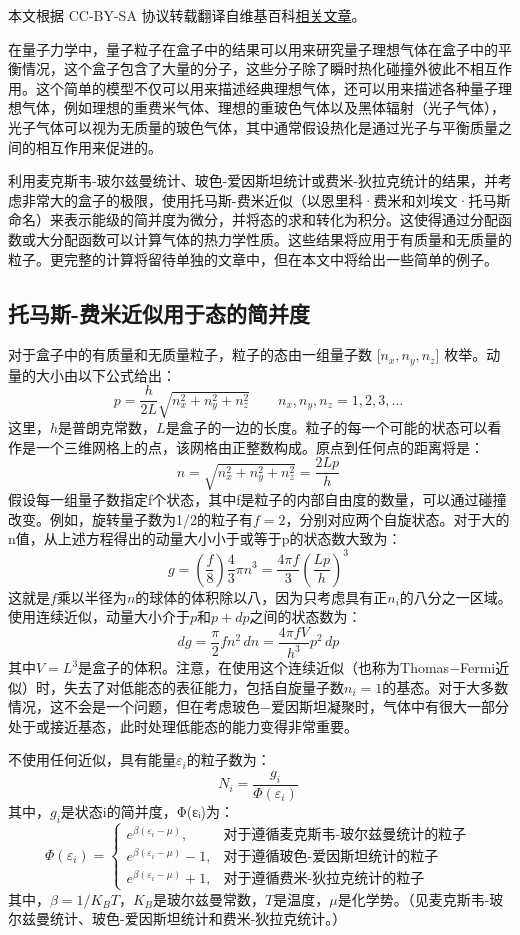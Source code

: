 
本文根据 CC-BY-SA 协议转载翻译自维基百科\href{https://en.wikipedia.org/wiki/Gas_in_a_box}{相关文章}。

在量子力学中，量子粒子在盒子中的结果可以用来研究量子理想气体在盒子中的平衡情况，这个盒子包含了大量的分子，这些分子除了瞬时热化碰撞外彼此不相互作用。这个简单的模型不仅可以用来描述经典理想气体，还可以用来描述各种量子理想气体，例如理想的重费米气体、理想的重玻色气体以及黑体辐射（光子气体），光子气体可以视为无质量的玻色气体，其中通常假设热化是通过光子与平衡质量之间的相互作用来促进的。

利用麦克斯韦-玻尔兹曼统计、玻色-爱因斯坦统计或费米-狄拉克统计的结果，并考虑非常大的盒子的极限，使用托马斯-费米近似（以恩里科·费米和刘埃文·托马斯命名）来表示能级的简并度为微分，并将态的求和转化为积分。这使得通过分配函数或大分配函数可以计算气体的热力学性质。这些结果将应用于有质量和无质量的粒子。更完整的计算将留待单独的文章中，但在本文中将给出一些简单的例子。
\subsection{托马斯-费米近似用于态的简并度}  
对于盒子中的有质量和无质量粒子，粒子的态由一组量子数 [\(n_x, n_y, n_z\)] 枚举。动量的大小由以下公式给出：
\[
p = \frac{h}{2L} \sqrt{n_x^2 + n_y^2 + n_z^2} \quad \quad n_x, n_y, n_z = 1, 2, 3, \ldots~
\]
这里，\(h\)是普朗克常数，\(L\)是盒子的一边的长度。粒子的每一个可能的状态可以看作是一个三维网格上的点，该网格由正整数构成。原点到任何点的距离将是：
\[
n = \sqrt{n_x^2 + n_y^2 + n_z^2} = \frac{2Lp}{h}~
\]
假设每一组量子数指定f个状态，其中f是粒子的内部自由度的数量，可以通过碰撞改变。例如，旋转量子数为1/2的粒子有\(f = 2\)，分别对应两个自旋状态。对于大的n值，从上述方程得出的动量大小小于或等于p的状态数大致为：
\[
g = \left( \frac{f}{8} \right) \frac{4}{3} \pi n^3 = \frac{4 \pi f}{3} \left( \frac{Lp}{h} \right)^3~
\]
这就是\(f\)乘以半径为\(n\)的球体的体积除以八，因为只考虑具有正\(n_i\)的八分之一区域。使用连续近似，动量大小介于\(p\)和\(p+dp\)之间的状态数为：
\[
dg = \frac{\pi}{2} f n^2 \, dn = \frac{4 \pi f V}{h^3} p^2 \, dp~
\]
其中\(V=L^3\)是盒子的体积。注意，在使用这个连续近似（也称为Thomas−Fermi近似）时，失去了对低能态的表征能力，包括自旋量子数\(n_i=1\)的基态。对于大多数情况，这不会是一个问题，但在考虑玻色−爱因斯坦凝聚时，气体中有很大一部分处于或接近基态，此时处理低能态的能力变得非常重要。

不使用任何近似，具有能量\(\varepsilon_i\)的粒子数为：
\[
N_i = \frac{g_i}{\Phi(\varepsilon_i)}~
\]
其中，\(g_i\)是状态i的简并度，Φ(εᵢ)为：
\[
\Phi(\varepsilon_i) =
\begin{cases}
e^{\beta (\varepsilon_i - \mu)}, & \text{对于遵循麦克斯韦-玻尔兹曼统计的粒子} \\
e^{\beta (\varepsilon_i - \mu)} - 1, & \text{对于遵循玻色-爱因斯坦统计的粒子} \\
e^{\beta (\varepsilon_i - \mu)} + 1, & \text{对于遵循费米-狄拉克统计的粒子}
\end{cases}~
\]
其中，\(\beta= 1/K_BT\)，\(K_B\)是玻尔兹曼常数，\(T\)是温度，\(\mu\)是化学势。（见麦克斯韦-玻尔兹曼统计、玻色-爱因斯坦统计和费米-狄拉克统计。）


